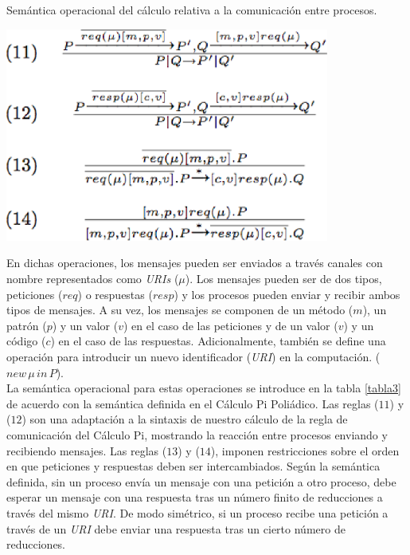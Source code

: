 \begin{table}
\vspace{2.4in}
\caption{Sem\'antica operacional del c\'alculo relativa a la comunicaci\'on entre procesos.}
\vspace{5mm}
\includegraphics[width=0.8\textwidth]{tabla3}
\label{tabla3}
\end{table}

En dichas operaciones, los mensajes pueden ser enviados a trav\'es canales con nombre representados como \textit{URIs} ($\mu$). Los mensajes pueden ser de dos tipos, peticiones ($req$) o respuestas ($resp$) y los procesos pueden enviar y recibir ambos tipos de mensajes. A su vez, los mensajes se componen de un m\'etodo ($m$), un patr\'on ($p$) y un valor ($v$) en el caso de las peticiones y de un valor ($v$) y un c\'odigo ($c$) en el caso de las respuestas. Adicionalmente, tambi\'en se define una operaci\'on para introducir un nuevo identificador (\textit{URI}) en la computaci\'on. ($new\, \mu\, in\,P$).\\
La sem\'antica operacional para estas operaciones se introduce en la tabla \ref{tabla3} de acuerdo con la sem\'antica definida en el C\'alculo Pi Poli\'adico. Las reglas ($11$) y ($12$) son una adaptaci\'on a la sintaxis de nuestro c\'alculo de la regla de comunicaci\'on del C\'alculo Pi, mostrando la reacci\'on entre procesos enviando y recibiendo mensajes. Las reglas ($13$) y ($14$), imponen restricciones sobre el orden en que peticiones y respuestas deben ser intercambiados. Seg\'un la sem\'antica definida, sin un proceso env\'ia un mensaje con una petici\'on a otro proceso, debe esperar un mensaje con una respuesta  tras un n\'umero finito de reducciones a trav\'es del mismo \textit{URI}. De modo sim\'etrico, si un proceso recibe una petici\'on a trav\'es de un \textit{URI} debe enviar una respuesta tras un cierto n\'umero de reducciones.


